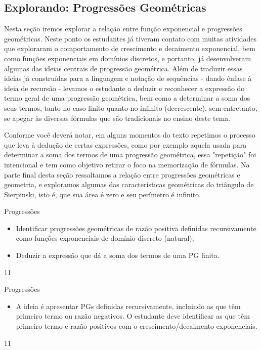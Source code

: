 \cleardoublepage
\def\currentcolor{session1}
\begin{texto}
{
\section{Explorando: Progressões Geométricas}
Nesta seção iremos explorar a relação entre função exponencial e progressões geométricas. Neste ponto os estudantes já tiveram contato com muitas atividades que exploraram o comportamento de crescimento e decaimento exponencial, bem como funções exponenciais em domínios discretos, e portanto, já desenvolveram algumas das ideias centrais de progressão geométrica. Além de traduzir essas ideias já construídas para a linguagem e notação de sequências - dando ênfase à ideia de recursão - levamos o estudante a deduzir e reconhecer a expressão do termo geral de uma progressão geométrica, bem como a determinar a soma dos seus termos, tanto no caso finito quanto no infinito (decrescente), sem entretanto, se apegar às diversas fórmulas que são tradicionais no ensino deste tema.

Conforme você deverá notar, em alguns momentos do texto repetimos o processo que leva à dedução de certas expressões, como por exemplo aquela usada para determinar a soma dos termos de uma progressão geométrica, essa "repetição" foi intencional e tem como objetivo retirar o foco na memorização de fórmulas. Na parte final desta seção ressaltamos a relação entre progressões geométricas e geometria, e exploramos algumas das características geométricas do triângulo de Sierpinski, isto é, que sua área é zero e seu perímetro é infinito.
}
\end{texto}
\begin{objectives}{Progressões}
{
\begin{itemize}
\item Identificar progressões geométricas de razão positiva definidas recursivamente como funções exponenciais de domínio discreto (natural);
\end{itemize}


\begin{itemize}
\item Deduzir a expressão que dá a soma dos termos de uma PG finita.
\end{itemize}
}{1}{1}
\end{objectives}
\begin{sugestions}{Progressões}
{
\begin{itemize}

\item A ideia é apresentar PGs definidas recursivamente, incluindo as que têm primeiro termo ou razão negativos. O estudante deve identificar as que têm primeiro termo e razão positivos com o crescimento/decaimento exponenciais.

\end{itemize}
}{1}{1}
\end{sugestions}
